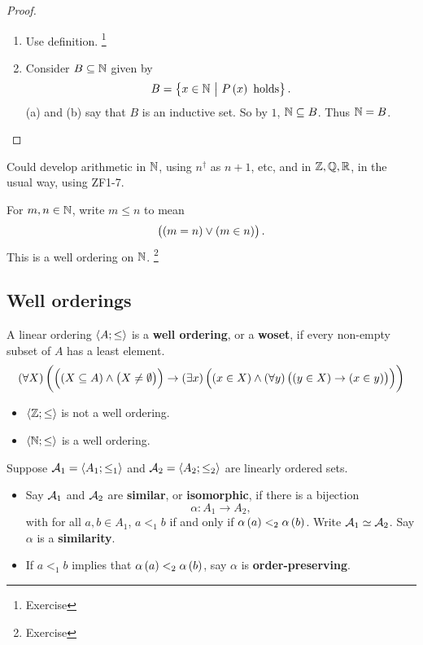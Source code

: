 \pagebreak

\begin{proof}
\hfill
\begin{enumerate}
\item Use definition. \footnote{Exercise}
\item Consider $ B \subseteq \mathbb{N} $ given by
$$ B = \cbr{x \in \NN \st P\br{x} \ \text{holds}}. $$
(a) and (b) say that $ B $ is an inductive set. So by $ 1 $, $ \mathbb{N} \subseteq B $. Thus $ \mathbb{N} = B $.
\end{enumerate}
\end{proof}

Could develop arithmetic in $ \mathbb{N} $, using $ n^\dagger $ as $ n + 1 $, etc, and in $ \mathbb{Z}, \mathbb{Q}, \mathbb{R} $, in the usual way, using ZF1-7.

\begin{example*}
For $ m, n \in \mathbb{N} $, write $ m \le n $ to mean
$$ \orb{\eqb{m}{n}}{\inb{m}{n}}. $$
This is a well ordering on $ \mathbb{N} $. \footnote{Exercise}
\end{example*}

\subsection{Well orderings}

\begin{definition}
A linear ordering $ \left\langle A; \le \right\rangle $ is a \textbf{well ordering}, or a \textbf{woset}, if every non-empty subset of $ A $ has a least element.
$$ \fab{X}\impb{\andb{\subb{X}{A}}{\neb{X}{\emptyset}}}{\teb{x}\andb{\inb{x}{X}}{\fab{y}\impb{\inb{y}{X}}{\inb{x}{y}}}} $$
\end{definition}

\begin{example*}
\hfill
\begin{itemize}
\item $ \left\langle \mathbb{Z}; \le \right\rangle $ is not a well ordering.
\item $ \left\langle \mathbb{N}; \le \right\rangle $ is a well ordering.
\end{itemize}
\end{example*}


Suppose $ \mathcal{A}_1 = \left\langle A_1; \le_1 \right\rangle $ and $ \mathcal{A}_2 = \left\langle A_2; \le_2 \right\rangle $ are linearly ordered sets.

\begin{definition}
\hfill
\begin{itemize}
\item Say $ \mathcal{A}_1 $ and $ \mathcal{A}_2 $ are \textbf{similar}, or \textbf{isomorphic}, if there is a bijection
$$ \alpha : A_1 \to A_2, $$
with for all $ a, b \in A_1 $, $ a <_1 b $ if and only if $ \alpha\br{a} <_2 \alpha\br{b} $. Write $ \mathcal{A}_1 \simeq \mathcal{A}_2 $. Say $ \alpha $ is a \textbf{similarity}.
\item If $ a <_1 b $ implies that $ \alpha\br{a} <_2 \alpha\br{b} $, say $ \alpha $ is \textbf{order-preserving}.
\end{itemize}
\end{definition}

